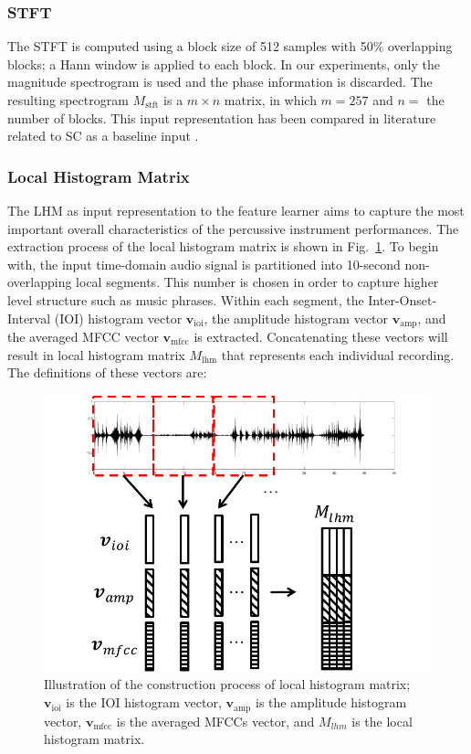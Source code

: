 \documentclass[conference]{IEEEtran}
\begin{document}
\subsubsection{STFT}\label{subsec:stft}
The STFT is computed using a block size of 512 samples with 50\% overlapping blocks; a Hann window is applied to each block. In our experiments, only the magnitude spectrogram is used and the phase information is discarded. The resulting spectrogram $M_\mathrm{stft}$ is a $m \times n$ matrix, in which $m = 257$ and $n = $ the number of blocks. This input representation has been compared in literature related to SC as a baseline input \cite{Su2014Guitar, Su2014Violin}. 

\subsubsection{Local Histogram Matrix}
The LHM as input representation to the feature learner aims to capture the most important overall characteristics of the percussive instrument performances. The extraction process of the local histogram matrix is shown in Fig.~\ref{fig:hist_mat}. To begin with, the input time-domain audio signal is partitioned into 10-second non-overlapping local segments. This number is chosen in order to capture higher level structure such as music phrases. Within each segment, the Inter-Onset-Interval (IOI) histogram vector $\mathbf{v}_\mathrm{ioi}$, the amplitude histogram vector $\mathbf{v}_\mathrm{amp}$, and the averaged MFCC vector $\mathbf{v}_\mathrm{mfcc}$ is extracted.
Concatenating these vectors will result in local histogram matrix $M_\mathrm{lhm}$ that represents each individual recording. The definitions of these vectors are:
\begin{figure}
    \centering
    \includegraphics[width = 8 cm]{./figs/hist_mat.pdf}
    \caption{Illustration of the construction process of local histogram matrix; $\mathbf{v}_\mathrm{ioi}$ is the IOI histogram vector, $\mathbf{v}_\mathrm{amp}$ is the amplitude histogram vector, $\mathbf{v}_\mathrm{mfcc}$ is the averaged MFCCs vector, and $M_{lhm}$ is the local histogram matrix.}
    \label{fig:hist_mat}
\end{figure}
\end{document}
